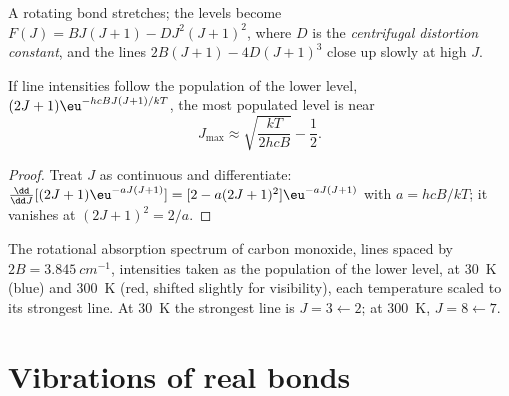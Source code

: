 \begin{definition}\label{def:b3:rovibrational-spectroscopy:centrifugal}
A rotating bond stretches; the levels become $F(J) = BJ(J+1) - DJ^2(J+1)^2$,
where $D$ is the \emph{centrifugal distortion constant},
and the lines $2B(J+1) - 4D(J+1)^3$ close up slowly at
high $J$.
\end{definition}

\begin{proposition}\label{prop:b3:rovibrational-spectroscopy:jmax}
If line intensities follow the population of the lower level, $(2J+1)
\eu^{-hcBJ(J+1)/kT}$, the most populated level is near
\[
J_{\max} \approx \sqrt{\frac{kT}{2hcB}} - \frac12.
\]
\end{proposition}

\begin{proof}
Treat $J$ as continuous and differentiate: $\frac{\dd}{\dd J}[(2J+1)\eu^{-aJ(J+1)}]
= [2 - a(2J+1)^2]\eu^{-aJ(J+1)}$ with $a = hcB/kT$; it vanishes at $(2J + 1)^2 =
2/a$.
\end{proof}

\begin{omfigure}

{\small The rotational absorption spectrum of carbon monoxide, lines spaced
by $2B = \qty{3.845}{cm^{-1}}$, intensities taken as the population of the
lower level, at \qty{30}{K} (blue) and \qty{300}{K} (red, shifted slightly for
visibility), each temperature scaled to its strongest line. At \qty{30}{K} the strongest line is
$J = 3 \leftarrow 2$; at \qty{300}{K}, $J = 8 \leftarrow 7$.}
\end{omfigure}

\section{Vibrations of real bonds}\label{sec:b3:rovibrational-spectroscopy:real-bonds}

